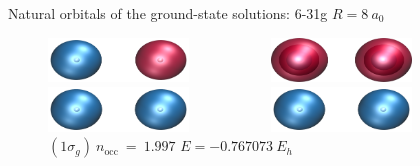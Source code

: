 \documentclass[10pt]{beamer}
\begin{document}
\begin{frame}{Natural orbitals of the ground-state solutions:  6-31g $R=8~a_0$}
  \begin{figure}
    \begin{columns}[b]

      \begin{column}{0.31\textwidth}
        \includegraphics[width=0.7\textwidth]{Figures/h2_r8_HF_mo2.cube.png}
        \caption*{\centering $(1\sigma_u)~n_\text{occ}~=~0.985$}
        \includegraphics[width=0.7\textwidth]{Figures/h2_r8_HF_mo1.cube.png}
        \caption*{\centering $(1\sigma_g)~n_\text{occ}~=~1.015$
          $E=0.996485~E_h$}
      \end{column}
    
      \begin{column}{0.31\textwidth}
        \includegraphics[width=0.7\textwidth]{Figures/h2_r8_HF_mo3.cube.png}
        \caption*{\centering $(2\sigma_g)~n_\text{occ}~=~0.003$}
        \includegraphics[width=0.7\textwidth]{Figures/h2_r8_HF_mo1.cube.png}
        \caption*{\centering $(1\sigma_g)~n_\text{occ}~=~1.997$
          $E=-0.767073~E_h$}
      \end{column}
    

\end{columns}
\end{figure}
\end{frame}
\end{document}
